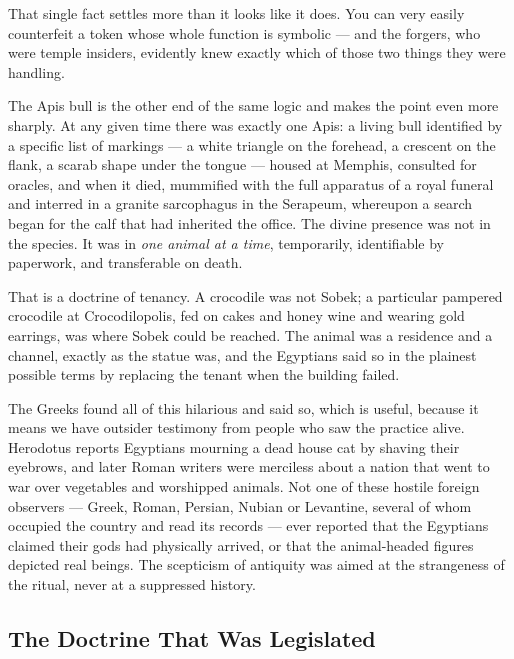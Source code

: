 That single fact settles more than it looks like it does.  You can very easily counterfeit a token whose whole function is symbolic --- and the
forgers, who were temple insiders, evidently knew exactly which of those two things they were
handling.

The Apis bull is the other end of the same logic and makes the point even more sharply. At any
given time there was exactly one Apis: a living bull identified by a specific list of
markings --- a white triangle on the forehead, a crescent on the flank, a scarab shape under the
tongue --- housed at Memphis, consulted for oracles, and when it died, mummified with the full
apparatus of a royal funeral and interred in a granite sarcophagus in the Serapeum, whereupon a
search began for the calf that had inherited the office. The divine presence was not in the
species. It was in \emph{one animal at a time}, temporarily, identifiable by paperwork, and
transferable on death.

That is a doctrine of tenancy. A crocodile was not Sobek; a particular pampered crocodile at
Crocodilopolis, fed on cakes and honey wine and wearing gold earrings, was where Sobek could be
reached. The animal was a residence and a channel, exactly as the statue was, and the Egyptians
said so in the plainest possible terms by replacing the tenant when the building failed.

\begin{funfact}
The Greeks found all of this hilarious and said so, which is useful, because it means we have
outsider testimony from people who saw the practice alive. Herodotus reports Egyptians mourning a
dead house cat by shaving their eyebrows, and later Roman writers were merciless about a nation
that went to war over vegetables and worshipped animals. Not one of these hostile foreign
observers --- Greek, Roman, Persian, Nubian or Levantine, several of whom occupied the country and
read its records --- ever reported that the Egyptians claimed their gods had physically arrived,
or that the animal-headed figures depicted real beings. The scepticism of antiquity was aimed at
the strangeness of the ritual, never at a suppressed history.
\end{funfact}

\subsection{The Doctrine That Was Legislated}\label{sec:atenexperiment}


